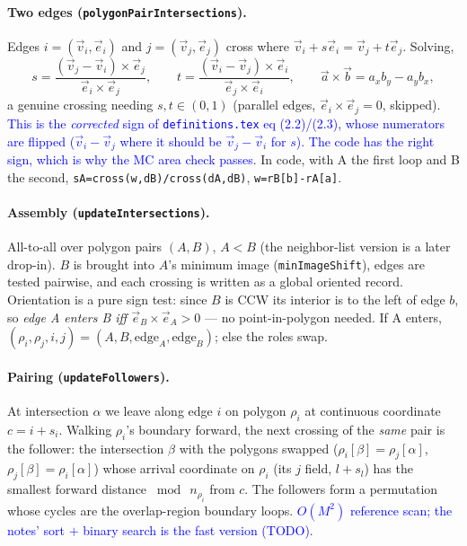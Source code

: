 \documentclass[11pt]{article}
\newcommand{\vv}[1]{\vec{#1}}
\newcommand{\cross}[2]{#1\!\times\!#2}
\newcommand{\code}[1]{\texttt{#1}}
\newcommand{\note}[1]{\textcolor{blue}{#1}}
\begin{document}
\paragraph{Two edges (\code{polygonPairIntersections}).} Edges $i=(\vv v_i,\vv e_i)$ and $j=(\vv
v_j,\vv e_j)$ cross where $\vv v_i+s\vv e_i=\vv v_j+t\vv e_j$. Solving,
\begin{equation}
  s=\frac{\cross{(\vv v_j-\vv v_i)}{\vv e_j}}{\cross{\vv e_i}{\vv e_j}},\qquad
  t=\frac{\cross{(\vv v_i-\vv v_j)}{\vv e_i}}{\cross{\vv e_j}{\vv e_i}},
  \qquad \cross{\vv a}{\vv b}=a_xb_y-a_yb_x,
\end{equation}
a genuine crossing needing $s,t\in(0,1)$ (parallel edges, $\cross{\vv e_i}{\vv e_j}=0$, skipped).
\note{This is the \emph{corrected} sign of \texttt{definitions.tex} eq (2.2)/(2.3), whose numerators
are flipped ($\vv v_i-\vv v_j$ where it should be $\vv v_j-\vv v_i$ for $s$). The code has the right
sign, which is why the MC area check passes.} In code, with A the first loop and B the second,
\code{sA=cross(w,dB)/cross(dA,dB)}, \code{w=rB[b]-rA[a]}.

\paragraph{Assembly (\code{updateIntersections}).} All-to-all over polygon pairs $(A,B)$, $A<B$ (the
neighbor-list version is a later drop-in). $B$ is brought into $A$'s minimum image
(\code{minImageShift}), edges are tested pairwise, and each crossing is written as a global oriented
record. Orientation is a pure sign test: since $B$ is CCW its interior is to the left of edge $b$, so
\emph{edge A enters B iff $\cross{\vv e_B}{\vv e_A}>0$} --- no point-in-polygon needed. If A enters,
$(\rho_i,\rho_j,i,j)=(A,B,\text{edge}_A,\text{edge}_B)$; else the roles swap.

\paragraph{Pairing (\code{updateFollowers}).} At intersection $\alpha$ we leave along edge $i$ on
polygon $\rho_i$ at continuous coordinate $c=i+s_i$. Walking $\rho_i$'s boundary forward, the next
crossing of the \emph{same} pair is the follower: the intersection $\beta$ with the polygons swapped
($\rho_i[\beta]=\rho_j[\alpha]$, $\rho_j[\beta]=\rho_i[\alpha]$) whose arrival coordinate on $\rho_i$
(its $j$ field, $l+s_l$) has the smallest forward distance $\bmod\ n_{\rho_i}$ from $c$. The
followers form a permutation whose cycles are the overlap-region boundary loops. \note{$O(M^2)$
reference scan; the notes' sort $+$ binary search is the fast version (TODO).}
\end{document}
